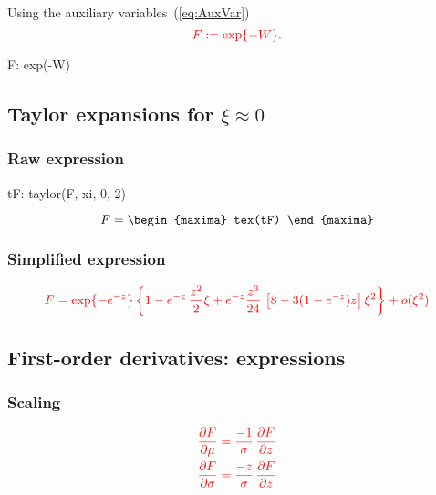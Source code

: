 Using the auxiliary variables~(\ref{eq:AuxVar})
\begin{equation}
  \color{red}
  \label{eq:DefF}
  F := \exp\{ - W \}.
\end{equation}

\begin{maxima}
  F: exp(-W)
\end{maxima}

\subsection{Taylor expansions for $\xi \approx 0$}
\subsubsection*{Raw expression}

\begin{maxima}
  tF: taylor(F, xi, 0, 2)
\end{maxima}

{\color{MonVertF}  
\begin{equation*}
  F =
  \begin{maxima}
    tex(tF)
  \end{maxima}
\end{equation*}
}
\subsubsection*{Simplified expression}
\begin{equation}
  \label{eq:SimpF}
  \color{red}
  F = \exp\{-e^{-z}\} \left\{ 1 - e^{-z} \,\frac{z^2}{2} \xi +
    e^{-z} \frac{z^3}{24} \,\left[ 8 - 3 (1 - e^{-z}) z \right] \xi^2 \right\} +
  o(\xi^2)
\end{equation}

\subsection{First-order derivatives: expressions}

\subsubsection*{Scaling}
\begin{equation}
  \color{red}
  \label{eq:ScaleDer1F}
  \begin{aligned}
    \frac{\partial F}{\partial \mu}
    &= \frac{-1}{\sigma} \,\frac{\partial F}{\partial z}\\
    \frac{\partial F}{\partial \sigma}
    &= \frac{-z}{\sigma} \,\frac{\partial F}{\partial z}
  \end{aligned}
\end{equation}

